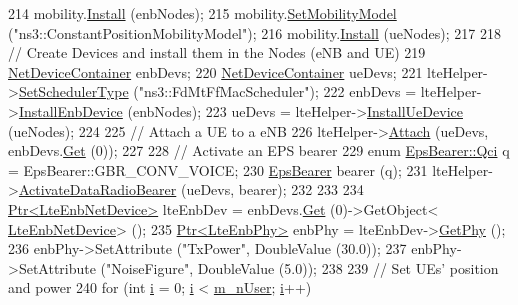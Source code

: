\begin{DoxyCode}
214   mobility.\hyperlink{classns3_1_1MobilityHelper_a07737960ee95c0777109cf2994dd97ae}{Install} (enbNodes);
215   mobility.\hyperlink{classns3_1_1MobilityHelper_a030275011b6f40682e70534d30280aba}{SetMobilityModel} (\textcolor{stringliteral}{"ns3::ConstantPositionMobilityModel"});
216   mobility.\hyperlink{classns3_1_1MobilityHelper_a07737960ee95c0777109cf2994dd97ae}{Install} (ueNodes);
217 
218   \textcolor{comment}{// Create Devices and install them in the Nodes (eNB and UE)}
219   \hyperlink{classns3_1_1NetDeviceContainer}{NetDeviceContainer} enbDevs;
220   \hyperlink{classns3_1_1NetDeviceContainer}{NetDeviceContainer} ueDevs;
221   lteHelper->\hyperlink{classns3_1_1LteHelper_a8f86e55b8b80a81732c4b2df00fb25d5}{SetSchedulerType} (\textcolor{stringliteral}{"ns3::FdMtFfMacScheduler"});
222   enbDevs = lteHelper->\hyperlink{classns3_1_1LteHelper_a5e009ad35ef85f46b5a6099263f15a03}{InstallEnbDevice} (enbNodes);
223   ueDevs = lteHelper->\hyperlink{classns3_1_1LteHelper_ac9cd932d7de92811cfa953c2e3b2fc9f}{InstallUeDevice} (ueNodes);
224 
225   \textcolor{comment}{// Attach a UE to a eNB}
226   lteHelper->\hyperlink{classns3_1_1LteHelper_a9466743f826aa2652a87907b7f0a1c87}{Attach} (ueDevs, enbDevs.\hyperlink{classns3_1_1NetDeviceContainer_a677d62594b5c9d2dea155cc5045f4d0b}{Get} (0));
227 
228   \textcolor{comment}{// Activate an EPS bearer}
229   \textcolor{keyword}{enum} \hyperlink{structns3_1_1EpsBearer_aecf0c67109c5eb4ec0b07226fff5885e}{EpsBearer::Qci} q = EpsBearer::GBR\_CONV\_VOICE;
230   \hyperlink{structns3_1_1EpsBearer}{EpsBearer} bearer (q);
231   lteHelper->\hyperlink{classns3_1_1LteHelper_ac896e16cf162e4beeaa292d39ab1b700}{ActivateDataRadioBearer} (ueDevs, bearer);
232   
233  
234   \hyperlink{classns3_1_1Ptr}{Ptr<LteEnbNetDevice>} lteEnbDev = enbDevs.\hyperlink{classns3_1_1NetDeviceContainer_a677d62594b5c9d2dea155cc5045f4d0b}{Get} (0)->GetObject<
      \hyperlink{classns3_1_1LteEnbNetDevice}{LteEnbNetDevice}> ();
235   \hyperlink{classns3_1_1Ptr}{Ptr<LteEnbPhy>} enbPhy = lteEnbDev->\hyperlink{classns3_1_1LteEnbNetDevice_a58db72130e0740f16a5e03b22e4a10a4}{GetPhy} ();
236   enbPhy->SetAttribute (\textcolor{stringliteral}{"TxPower"}, DoubleValue (30.0));
237   enbPhy->SetAttribute (\textcolor{stringliteral}{"NoiseFigure"}, DoubleValue (5.0));
238 
239   \textcolor{comment}{// Set UEs' position and power}
240   \textcolor{keywordflow}{for} (\textcolor{keywordtype}{int} \hyperlink{bernuolliDistribution_8m_a6f6ccfcf58b31cb6412107d9d5281426}{i} = 0; \hyperlink{bernuolliDistribution_8m_a6f6ccfcf58b31cb6412107d9d5281426}{i} < \hyperlink{classLenaFdMtFfMacSchedulerTestCase_ad37e35252bb964ef3416fc10774ed9d1}{m\_nUser}; \hyperlink{bernuolliDistribution_8m_a6f6ccfcf58b31cb6412107d9d5281426}{i}++)

\end{DoxyCode}
